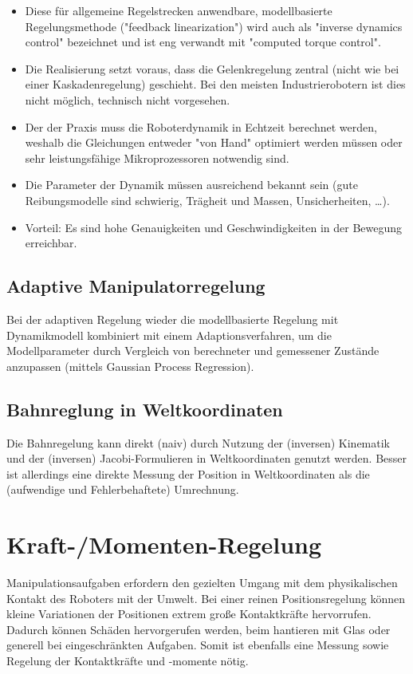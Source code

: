 			\begin{itemize}
				\item Diese für allgemeine Regelstrecken anwendbare, modellbasierte Regelungsmethode ("feedback linearization") wird auch als "inverse dynamics control" bezeichnet und ist eng verwandt mit "computed torque control".
				\item Die Realisierung setzt voraus, dass die Gelenkregelung zentral (\dh nicht wie bei einer Kaskadenregelung) geschieht. Bei den meisten Industrierobotern ist dies nicht möglich, \bzw technisch nicht vorgesehen.
				\item Der der Praxis muss die Roboterdynamik in Echtzeit berechnet werden, weshalb die Gleichungen entweder "von Hand" optimiert werden müssen oder sehr leistungsfähige Mikroprozessoren notwendig sind.
				\item Die Parameter der Dynamik müssen ausreichend bekannt sein (gute Reibungsmodelle sind \iA schwierig, Trägheit und Massen, Unsicherheiten, \dots).
				\item Vorteil: Es sind hohe Genauigkeiten und Geschwindigkeiten in der Bewegung erreichbar.
			\end{itemize}

		\subsection{Adaptive Manipulatorregelung}
			Bei der adaptiven Regelung wieder die modellbasierte Regelung mit Dynamikmodell kombiniert mit einem Adaptionsverfahren, um die Modellparameter durch Vergleich von berechneter und gemessener Zustände anzupassen (\bspw mittels Gaussian Process Regression).

		\subsection{Bahnreglung in Weltkoordinaten}
			\label{sec:cartesiancontrol}
		
			Die Bahnregelung kann direkt (naiv) durch Nutzung der (inversen) Kinematik und der (inversen) Jacobi-Formulieren in Weltkoordinaten genutzt werden. Besser ist allerdings eine direkte Messung der Position in Weltkoordinaten als die (aufwendige und Fehlerbehaftete) Umrechnung.

	\section{Kraft-/Momenten-Regelung}
		Manipulationsaufgaben erfordern den gezielten Umgang mit dem physikalischen Kontakt des Roboters mit der Umwelt. Bei einer reinen Positionsregelung können kleine Variationen der Positionen extrem große Kontaktkräfte hervorrufen. Dadurch können Schäden hervorgerufen werden, \bspw beim hantieren mit Glas oder generell bei eingeschränkten Aufgaben. Somit ist ebenfalls eine Messung sowie Regelung der Kontaktkräfte und -momente nötig.
		
